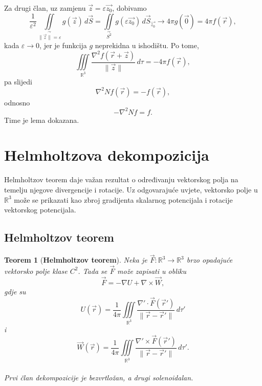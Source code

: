 \documentclass[12pt,a4paper]{article}
\makeatletter
\newtheorem{tm}{Teorem}[section]
\renewenvironment{proof}[1][\proofname]{\par
  \pushQED{\qed}%
  \normalfont
  \topsep6\p@\@plus6\p@\relax
  \trivlist
  \item[\hskip\labelsep
  \bfseries #1\@addpunct{.}]\ignorespaces
}{%
  \popQED\endtrivlist\@endpefalse
}
\makeatother
\begin{document}
\begin{proof}
Za drugi član, uz zamjenu
\(\overrightarrow{z}=\varepsilon\overrightarrow{z_0}\), dobivamo
\[
\frac{1}{\varepsilon^2}
\iint\limits_{\overset{\curvearrowright}{\|\overrightarrow{z}\|=\varepsilon}}
g(\overrightarrow{z})\,d\overrightarrow{S}
=
\iint\limits_{\overset{\curvearrowright}{S^2}}
g(\varepsilon\overrightarrow{z_0})\,d\overrightarrow{S}_{\overrightarrow{z_0}}
\longrightarrow
4\pi g(\overrightarrow{0})
=
4\pi f(\overrightarrow{r}),
\]
kada $\varepsilon \to 0$, jer je funkcija $g$ neprekidna u ishodištu.
Po tome,
\[
\iiint\limits_{\mathbb{R}^3}
\frac{\nabla^2f(\overrightarrow{r}+\overrightarrow{z})}
{\|\overrightarrow{z}\|}\,d\tau
=
-4\pi f(\overrightarrow{r}),
\]
pa slijedi
\[
\nabla^2Nf(\overrightarrow{r})
=
-f(\overrightarrow{r}),
\]
odnosno
\[
-\nabla^2Nf=f.
\]
Time je lema dokazana.
\end{proof}

\section{Helmholtzova dekompozicija}
Helmholtzov teorem daje važan rezultat o određivanju vektorskog polja na temelju njegove divergencije i rotacije. Uz odgovarajuće uvjete, vektorsko polje u $\mathbb{R}^3$ može se prikazati kao zbroj gradijenta skalarnog potencijala i rotacije vektorskog potencijala.
\subsection{Helmholtzov teorem}

\begin{tm}[\textbf{Helmholtzov teorem}]
     Neka je \(\overrightarrow{F}:\mathbb{R}^3\to\mathbb{R}^3\) brzo opadajuće vektorsko polje klase \(C^2\). Tada se \(\overrightarrow{F}\) može zapisati u obliku
$$ \overrightarrow{F}=-\nabla U+\nabla\times\overrightarrow{W}, $$
gdje su
$$ U(\overrightarrow{r}) = \frac1{4\pi}\iiint\limits_{\mathbb{R}^3} \frac{\nabla'\cdot\overrightarrow{F}(\overrightarrow{r}')} {\|\overrightarrow{r}-\overrightarrow{r}'\|}\,d\tau' $$
i
$$ \overrightarrow{W}(\overrightarrow{r}) = \frac1{4\pi}\iiint\limits_{\mathbb{R}^3} \frac{\nabla'\times\overrightarrow{F}(\overrightarrow{r}')} {\|\overrightarrow{r}-\overrightarrow{r}'\|}\,d\tau'. $$\\
Prvi član dekompozicije je bezvrtložan, a drugi solenoidalan.
\end{tm}
\end{document}
